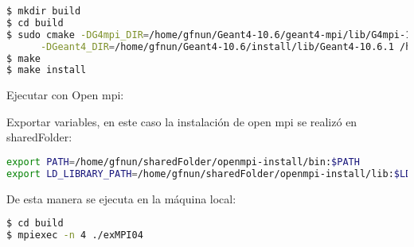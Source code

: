 \begin{lstlisting}[language=bash,style=mystyle]
$ mkdir build
$ cd build
$ sudo cmake -DG4mpi_DIR=/home/gfnun/Geant4-10.6/geant4-mpi/lib/G4mpi-10.6.1 -DCMAKE_CXX_COMPILER=/home/gfnun/sharedFolder/openmpi-install/bin/mpicxx \
      -DGeant4_DIR=/home/gfnun/Geant4-10.6/install/lib/Geant4-10.6.1 /home/gfnun/Geant4-10.6/src/geant4.10.06.p01/examples/extended/parallel/MPI/examples/exMPI04
$ make
$ make install
\end{lstlisting}

Ejecutar con Open mpi:

Exportar variables, en este caso la instalación de open mpi se realizó en sharedFolder:

\begin{lstlisting}[language=bash,style=mystyle]
export PATH=/home/gfnun/sharedFolder/openmpi-install/bin:$PATH
export LD_LIBRARY_PATH=/home/gfnun/sharedFolder/openmpi-install/lib:$LD_LIBRARY_PATH 
\end{lstlisting}

De esta manera se ejecuta en la máquina local:

\begin{lstlisting}[language=bash,style=mystyle]
$ cd build
$ mpiexec -n 4 ./exMPI04
\end{lstlisting}





    





